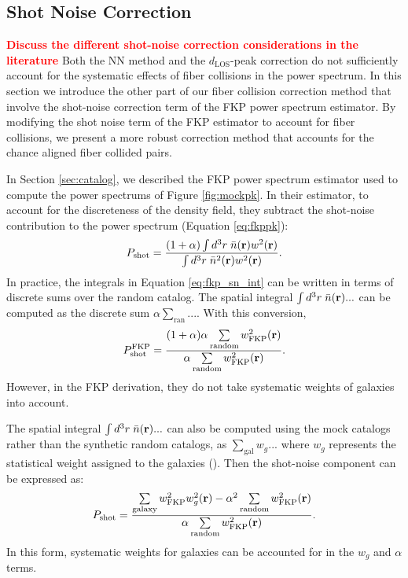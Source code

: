 \documentclass{emulateapj}
\newcommand{\todo}[1]{{\bf \textcolor{red}{ #1}}}
\begin{document}
\subsection{Shot Noise Correction} \label{sec:shotnoise} 
\todo{Discuss the different shot-noise correction considerations in the literature}
Both the NN method and the $d_\mathrm{LOS}$-peak correction do not sufficiently account for the systematic effects of fiber collisions in the power spectrum. In this section we introduce the other part of our fiber collision correction method that involve the shot-noise correction term of the FKP power spectrum estimator. By modifying the shot noise term of the FKP estimator to account for fiber collisions, we present a more robust correction method that accounts for the chance aligned fiber collided pairs. 

In Section \ref{sec:catalog}, we described the FKP power spectrum estimator used to compute the power spectrums of Figure \ref{fig:mockpk}. In their estimator, to account for the discreteness of the density field, they subtract the shot-noise contribution to the power spectrum (Equation \ref{eq:fkppk}): 
\begin{equation} \label{eq:fkp_sn_int}
P_\mathrm{shot} = \frac{ (1+\alpha) \int d^3r \;\bar{n}({\bf r})w^2({\bf r})}{\int d^3r \;\bar{n}^2({\bf r})w^2({\bf r})}. 
\end{equation}
In practice, the integrals in Equation \ref{eq:fkp_sn_int} can be written in terms of discrete sums over the random catalog. The spatial integral $\int d^3r \; \bar{n}({\bf r}) ...$ can be computed as the discrete sum $\alpha \sum_{\mathrm{ran}}...$. With this conversion,
\begin{equation} \label{eq:fkp_shotnoise}
P^\mathrm{FKP}_\mathrm{shot} = \frac{(1+\alpha) \alpha \sum\limits_{\mathrm{random}} w_\mathrm{FKP}^2({\bf r})}{\alpha \sum\limits_{\mathrm{random}}w_\mathrm{FKP}^2({\bf r})}.
\end{equation} 
However, in the FKP derivation, they do not take systematic weights of galaxies into account.

The spatial integral $\int d^3r \;\bar{n}({\bf r})...$ can also be computed using the mock catalogs rather than the synthetic random catalogs, as $\sum_{\mathrm{gal}} w_g...$ where $w_g$ represents the statistical weight assigned to the galaxies (\citealt{Cole:2005aa, Yamamoto:2006aa, Beutler:2014aa, Gil-Marin:2014aa}). Then the shot-noise component can be expressed as: 
\begin{equation} \label{eq:fkpweight}
P_\mathrm{shot} = \frac{ \sum\limits_{\mathrm{galaxy}} w^2_\mathrm{FKP}w^2_g({\bf r})- \alpha^2 \sum\limits_{\mathrm{random}} w_\mathrm{FKP}^2({\bf r})}{\alpha \sum\limits_{\mathrm{random}}w_\mathrm{FKP}^2({\bf r})}.
\end{equation}
In this form, systematic weights for galaxies can be accounted for in the $w_g$ and $\alpha$ terms. 
\end{document}
